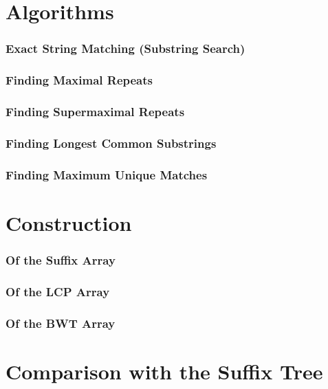 \documentclass[compress,handout]{beamer} %
\begin{document}
\section{Algorithms}

\begin{frame}
	\frametitle{Exact String Matching (Substring Search)}
\end{frame}

\begin{frame}
	\frametitle{Finding Maximal Repeats}
\end{frame}

\begin{frame}
	\frametitle{Finding Supermaximal Repeats}
\end{frame}

\begin{frame}
	\frametitle{Finding Longest Common Substrings}
\end{frame}

\begin{frame}
	\frametitle{Finding Maximum Unique Matches}
\end{frame}

\section{Construction}

\begin{frame}
	\frametitle{Of the Suffix Array}
\end{frame}

\begin{frame}
	\frametitle{Of the LCP Array}
\end{frame}

\begin{frame}
	\frametitle{Of the BWT Array}
\end{frame}

\section{Comparison with the Suffix Tree}
\end{document}
